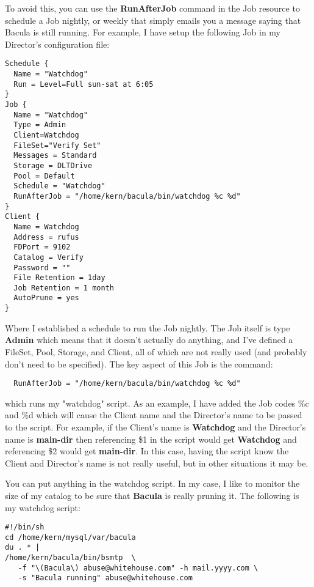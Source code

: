 To avoid this, you can use the {\bf RunAfterJob} command in the Job resource
to schedule a Job nightly, or weekly that simply emails you a message saying
that Bacula is still running. For example, I have setup the following Job in
my Director's configuration file: 

\footnotesize
\begin{verbatim}
Schedule {
  Name = "Watchdog"
  Run = Level=Full sun-sat at 6:05
}
Job {
  Name = "Watchdog"
  Type = Admin
  Client=Watchdog
  FileSet="Verify Set"
  Messages = Standard
  Storage = DLTDrive
  Pool = Default
  Schedule = "Watchdog"
  RunAfterJob = "/home/kern/bacula/bin/watchdog %c %d"
}
Client {
  Name = Watchdog
  Address = rufus
  FDPort = 9102
  Catalog = Verify
  Password = ""
  File Retention = 1day
  Job Retention = 1 month
  AutoPrune = yes
}
\end{verbatim}
\normalsize

Where I established a schedule to run the Job nightly. The Job itself is type
{\bf Admin} which means that it doesn't actually do anything, and I've defined
a FileSet, Pool, Storage, and Client, all of which are not really used (and
probably don't need to be specified). The key aspect of this Job is the
command: 

\footnotesize
\begin{verbatim}
  RunAfterJob = "/home/kern/bacula/bin/watchdog %c %d"
\end{verbatim}
\normalsize

which runs my "watchdog" script. As an example, I have added the Job codes
\%c and \%d which will cause the Client name and the Director's name to be
passed to the script. For example, if the Client's name is {\bf Watchdog} and
the Director's name is {\bf main-dir} then referencing \$1 in the script would
get {\bf Watchdog} and referencing \$2 would get {\bf main-dir}. In this case,
having the script know the Client and Director's name is not really useful,
but in other situations it may be. 

You can put anything in the watchdog script. In my case, I like to monitor the
size of my catalog to be sure that {\bf Bacula} is really pruning it. The
following is my watchdog script: 

\footnotesize
\begin{verbatim}
#!/bin/sh
cd /home/kern/mysql/var/bacula
du . * |
/home/kern/bacula/bin/bsmtp  \
   -f "\(Bacula\) abuse@whitehouse.com" -h mail.yyyy.com \
   -s "Bacula running" abuse@whitehouse.com
\end{verbatim}
\normalsize

